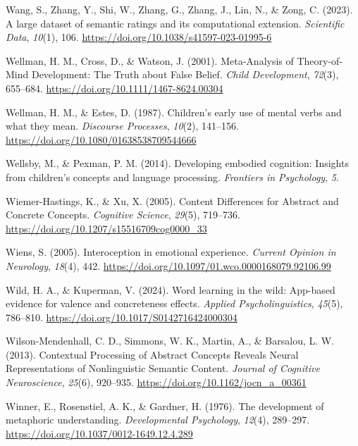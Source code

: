\documentclass[
  man,floatsintext]{apa6}
\newlength{\cslhangindent}
\newenvironment{CSLReferences}[2] %
 {\begin{list}{}{%
  \setlength{\itemindent}{0pt}
  \setlength{\leftmargin}{0pt}
  \setlength{\parsep}{0pt}
  \ifodd #1
   \setlength{\leftmargin}{\cslhangindent}
   \setlength{\itemindent}{-1\cslhangindent}
  \fi
  \setlength{\itemsep}{#2\baselineskip}}}
 {\end{list}}
\begin{document}
\begin{CSLReferences}{1}{0}
Wang, S., Zhang, Y., Shi, W., Zhang, G., Zhang, J., Lin, N., \& Zong, C. (2023). A large dataset of semantic ratings and its computational extension. \emph{Scientific Data}, \emph{10}(1), 106. \url{https://doi.org/10.1038/s41597-023-01995-6}

Wellman, H. M., Cross, D., \& Watson, J. (2001). Meta-{Analysis} of {Theory}-of-{Mind Development}: {The Truth} about {False Belief}. \emph{Child Development}, \emph{72}(3), 655--684. \url{https://doi.org/10.1111/1467-8624.00304}

Wellman, H. M., \& Estes, D. (1987). Children's early use of mental verbs and what they mean. \emph{Discourse Processes}, \emph{10}(2), 141--156. \url{https://doi.org/10.1080/01638538709544666}

Wellsby, M., \& Pexman, P. M. (2014). Developing embodied cognition: Insights from children's concepts and language processing. \emph{Frontiers in Psychology}, \emph{5}.

Wiemer-Hastings, K., \& Xu, X. (2005). Content {Differences} for {Abstract} and {Concrete Concepts}. \emph{Cognitive Science}, \emph{29}(5), 719--736. \url{https://doi.org/10.1207/s15516709cog0000_33}

Wiens, S. (2005). Interoception in emotional experience. \emph{Current Opinion in Neurology}, \emph{18}(4), 442. \url{https://doi.org/10.1097/01.wco.0000168079.92106.99}

Wild, H. A., \& Kuperman, V. (2024). Word learning in the wild: {App-based} evidence for valence and concreteness effects. \emph{Applied Psycholinguistics}, \emph{45}(5), 786--810. \url{https://doi.org/10.1017/S0142716424000304}

Wilson-Mendenhall, C. D., Simmons, W. K., Martin, A., \& Barsalou, L. W. (2013). Contextual {Processing} of {Abstract Concepts Reveals Neural Representations} of {Nonlinguistic Semantic Content}. \emph{Journal of Cognitive Neuroscience}, \emph{25}(6), 920--935. \url{https://doi.org/10.1162/jocn_a_00361}

Winner, E., Rosenstiel, A. K., \& Gardner, H. (1976). The development of metaphoric understanding. \emph{Developmental Psychology}, \emph{12}(4), 289--297. \url{https://doi.org/10.1037/0012-1649.12.4.289}


\end{CSLReferences}
\end{document}
